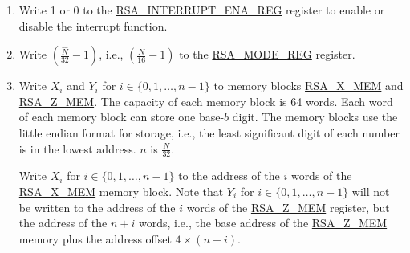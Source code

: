 \documentclass[main\_\_EN.tex]{subfiles}
\begin{document}
\begin{enumerate}

    \item Write 1 or 0 to the \hyperref[regdesc:RSAINTERRUPTENAREG]{RSA\_INTERRUPT\_ENA\_REG} register to enable or disable the interrupt function.

    \item Write \begin{math}( \frac{\hat{N}}{32} - 1 )\end{math}, i.e., \begin{math}( \frac{N}{16} - 1 )\end{math} to the \hyperref[regdesc:RSAMODEXPMODEREG]{RSA\_MODE\_REG} register.

    \item Write \begin{math}{X}_{i}\end{math} and \begin{math}{Y}_{i}\end{math} for \begin{math}i \in \{ 0, 1, \dots, n-1 \} \end{math} to memory blocks \hyperref[regdesc:RSAmemory]{RSA\_X\_MEM} and \hyperref[regdesc:RSAmemory]{RSA\_Z\_MEM}. The capacity of each memory block is 64 words. Each word of each memory block can store one base-\begin{math}b\end{math} digit. The memory blocks use the little endian format for storage, i.e., the least significant digit of each number is in the lowest address. \begin{math}n\end{math} is \begin{math} \frac{N}{32} \end{math}.

         Write \begin{math}{X}_{i}\end{math} for \begin{math}i \in \{ 0, 1, \dots, n-1 \} \end{math} to the address of the \begin{math}i\end{math} words of the \hyperref[regdesc:RSAmemory]{RSA\_X\_MEM} memory block. Note that \begin{math}{Y}_{i}\end{math} for \begin{math}i \in \{ 0, 1, \dots, n-1 \} \end{math} will not be written to the address of the \begin{math}i\end{math} words of the \hyperref[regdesc:RSAmemory]{RSA\_Z\_MEM} register, but the address of the \begin{math}n+i\end{math} words, i.e., the base address of the \hyperref[regdesc:RSAmemory]{RSA\_Z\_MEM} memory plus the address offset \begin{math}4 \times (n+i) \end{math}.


\end{enumerate}
\end{document}
